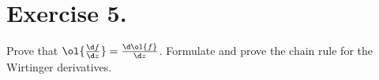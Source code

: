 \section*{Exercise 5.}

Prove that $\ol{\frac{\d f}{\d z}} = \frac{\d \ol{f}}{\d z}$. Formulate and prove the chain rule for the Wirtinger derivatives.